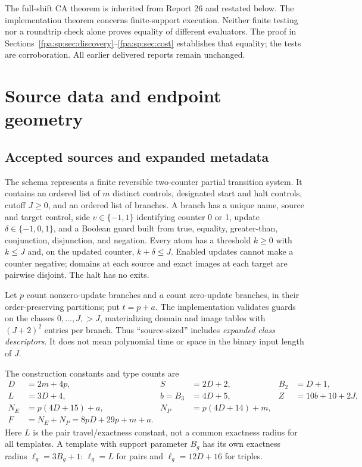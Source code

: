 \documentclass[11pt,a4paper]{article}
\numberwithin{equation}{section}
\newcommand{\file}[1]{\texttt{\detokenize{#1}}}
\begin{document}
The full-shift CA theorem is inherited from Report 26 and restated below. The implementation theorem concerns finite-support execution. Neither finite testing nor a roundtrip check alone proves equality of different evaluators. The proof in Sections~\ref{fpa:sp:sec:discovery}--\ref{fpa:sp:sec:cost} establishes that equality; the tests are corroboration. All earlier delivered reports remain unchanged.

\section{Source data and endpoint geometry}
\subsection{Accepted sources and expanded metadata}
The schema \file{reversible-two-counter-v1} represents a finite reversible two-counter partial transition system. It contains an ordered list of $m$ distinct controls, designated start and halt controls, cutoff $J\ge0$, and an ordered list of branches. A branch has a unique name, source and target control, side $v\in\{-1,1\}$ identifying counter 0 or 1, update $\delta\in\{-1,0,1\}$, and a Boolean guard built from true, equality, greater-than, conjunction, disjunction, and negation. Every atom has a threshold $k\ge0$ with $k\le J$ and, on the updated counter, $k+\delta\le J$. Enabled updates cannot make a counter negative; domains at each source and exact images at each target are pairwise disjoint. The halt has no exits.

Let $p$ count nonzero-update branches and $a$ count zero-update branches, in their order-preserving partitions; put $t=p+a$. The implementation validates guards on the classes $0,\ldots,J,>J$, materializing domain and image tables with $(J+2)^2$ entries per branch. Thus ``source-sized'' includes \emph{expanded class descriptors}. It does not mean polynomial time or space in the binary input length of $J$.

The construction constants and type counts are
\begin{align*}
D&=2m+4p,& S&=2D+2,& B_2&=D+1,\\
L&=3D+4,& b=B_3&=4D+5,& Z&=10b+10+2J,\\
N_E&=p(4D+15)+a,& N_P&=p(4D+14)+m,\\
F&=N_E+N_P=8pD+29p+m+a.&&&
\end{align*}
Here $L$ is the pair travel/exactness constant, not a common exactness radius for all templates. A template with support parameter $B_g$ has its own exactness radius $\ell_g=3B_g+1$: $\ell_g=L$ for pairs and $\ell_g=12D+16$ for triples.
\end{document}
